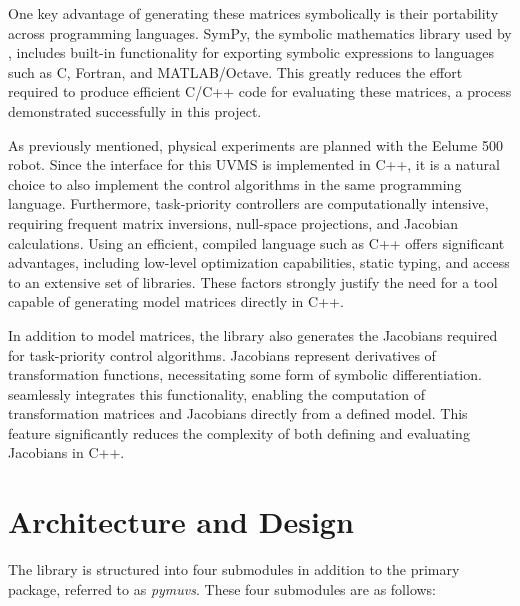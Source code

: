 One key advantage of generating these matrices symbolically is their 
portability across programming languages. SymPy, the symbolic mathematics 
library used by \pymuvs{}, includes built-in functionality for exporting 
symbolic expressions to languages such as C, Fortran, and MATLAB/Octave. This 
greatly reduces the effort required to produce efficient C/C++ code for 
evaluating these matrices, a process demonstrated successfully in this project.  

As previously mentioned, physical experiments are planned with the Eelume 500 
robot. Since the interface for this UVMS is implemented in C++, it is a natural 
choice to also implement the control algorithms in the same programming 
language. Furthermore, task-priority controllers are computationally intensive, 
requiring frequent matrix inversions, null-space projections, and Jacobian 
calculations. Using an efficient, compiled language such as C++ offers 
significant advantages, including low-level optimization capabilities, static 
typing, and access to an extensive set of libraries. These factors strongly 
justify the need for a tool capable of generating model matrices directly in 
C++.  

In addition to model matrices, the \pymuvs{} library also generates the 
Jacobians required for task-priority control algorithms. Jacobians represent 
derivatives of transformation functions, necessitating some form of symbolic 
differentiation. \pymuvs{} seamlessly integrates this functionality, enabling 
the computation of transformation matrices and Jacobians directly from a 
defined model. This feature significantly reduces the complexity of both 
defining and evaluating Jacobians in C++. 

\section{Architecture and Design}

The \pymuvs{} library is structured into four submodules in addition to the 
primary package, referred to as \emph{pymuvs}. These four submodules are as follows:

